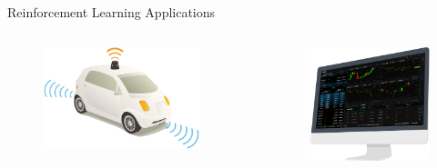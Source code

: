 \begin{frame}{Reinforcement Learning Applications}
\begin{columns}
	\onslide<+->
	\begin{column}{0.4\textwidth}
	\begin{figure}
		\centering
		\includegraphics[width=1\linewidth]{Images/self_driving_car}
	\end{figure}
	\end{column}
	
	\begin{column}{0.02\textwidth}
	\end{column}
	
	\onslide<+->
	\begin{column}{0.2\textwidth}
	\begin{figure}
		\centering
		\includegraphics[width=1\linewidth]{Images/portfolio_investment}
	\end{figure}
	\end{column}
	

\end{columns}
\end{frame}
